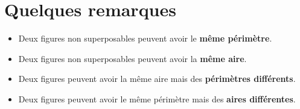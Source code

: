 \section{Quelques remarques}

\begin{remarques}
    \begin{itemize}
        \item Deux figures non superposables peuvent avoir le \textbf{même périmètre}.
        \item Deux figures non superposables peuvent avoir la \textbf{même aire}.
        \item Deux figures peuvent avoir la même aire mais des \textbf{périmètres différents}.
        \item Deux figures peuvent avoir le même périmètre mais des \textbf{aires différentes}.
    \end{itemize}
\end{remarques}


